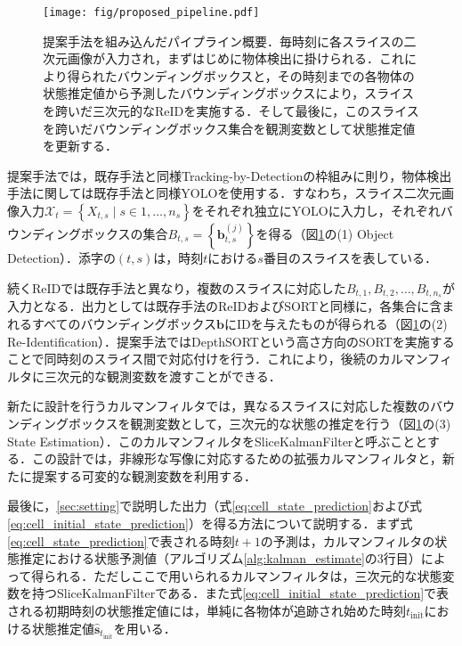    \begin{figure}[t]
        \centering
        \texttt{[image: fig/proposed\_pipeline.pdf]}
        \caption[提案手法を組み込んだパイプライン概要]{提案手法を組み込んだパイプライン概要．毎時刻に各スライスの二次元画像が入力され，まずはじめに物体検出に掛けられる．これにより得られたバウンディングボックスと，その時刻までの各物体の状態推定値から予測したバウンディングボックスにより，スライスを跨いだ三次元的なReIDを実施する．そして最後に，このスライスを跨いだバウンディングボックス集合を観測変数として状態推定値を更新する．}
        \label{fig:proposed_pipeline}
    \end{figure}

    提案手法では，既存手法と同様Tracking-by-Detectionの枠組みに則り，物体検出手法に関しては既存手法と同様YOLOを使用する．すなわち，スライス二次元画像入力$\mathcal{X}_t = \left\{X_{t, s} \mid s \in {1, \dots, n_s}\right\}$をそれぞれ独立にYOLOに入力し，それぞれバウンディングボックスの集合$B_{t,s} = \left\{\bm{b}_{t,s}^{(j)}\right\}$を得る（図\ref{fig:proposed_pipeline}の(1) Object Detection）．添字の$(t,s)$は，時刻$t$における$s$番目のスライスを表している．

    続くReIDでは既存手法と異なり，複数のスライスに対応した$B_{t,1}, B_{t,2}, \dots, B_{t,n_s}$が入力となる．出力としては既存手法のReIDおよびSORTと同様に，各集合に含まれるすべてのバウンディングボックス$\bm{b}$にIDを与えたものが得られる（図\ref{fig:proposed_pipeline}の(2) Re-Identification）．提案手法ではDepthSORTという高さ方向のSORTを実施することで同時刻のスライス間で対応付けを行う．これにより，後続のカルマンフィルタに三次元的な観測変数を渡すことができる．

    新たに設計を行うカルマンフィルタでは，異なるスライスに対応した複数のバウンディングボックスを観測変数として，三次元的な状態の推定を行う（図\ref{fig:proposed_pipeline}の(3) State Estimation）．このカルマンフィルタをSliceKalmanFilterと呼ぶこととする．この設計では，非線形な写像に対応するための拡張カルマンフィルタと，新たに提案する可変的な観測変数を利用する．

    最後に，\ref{sec:setting}で説明した出力（式\ref{eq:cell_state_prediction}および式\ref{eq:cell_initial_state_prediction}）を得る方法について説明する．まず式\ref{eq:cell_state_prediction}で表される時刻$t+1$の予測は，カルマンフィルタの状態推定における状態予測値（アルゴリズム\ref{alg:kalman_estimate}の3行目）によって得られる．ただしここで用いられるカルマンフィルタは，三次元的な状態変数を持つSliceKalmanFilterである．また式\ref{eq:cell_initial_state_prediction}で表される初期時刻の状態推定値には，単純に各物体が追跡され始めた時刻$t_{\text{init}}$における状態推定値$\hat{\bm{s}}_{t_{\text{init}}}$を用いる．

